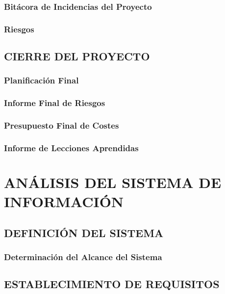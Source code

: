 \documentclass[11pt]{report}
\begin{document}
\subsection{Bitácora de Incidencias del Proyecto}

\subsection{Riesgos}


\newpage
\section{CIERRE DEL PROYECTO}

\subsection{Planificación Final}

\subsection{Informe Final de Riesgos}

\subsection{Presupuesto Final de Costes}

\subsection{Informe de Lecciones Aprendidas}



\newpage
\chapter{ANÁLISIS DEL SISTEMA DE INFORMACIÓN}

\newpage


\section{DEFINICIÓN DEL SISTEMA}

\subsection{Determinación del Alcance del Sistema}


\newpage
\section{ESTABLECIMIENTO DE REQUISITOS}
\end{document}
